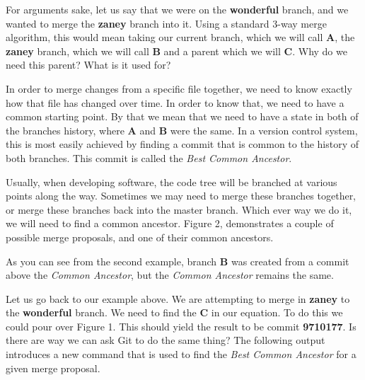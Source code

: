 
For arguments sake, let us say that we were on the \textbf{wonderful} branch, and we wanted to merge the \textbf{zaney} branch into it.
Using a standard 3-way merge algorithm, this would mean taking our current branch, which we will call \textbf{A}, the \textbf{zaney} branch, which we will call \textbf{B} and a parent which we will \textbf{C}.
Why do we need this parent? What is it used for?

In order to merge changes from a specific file together, we need to know exactly how that file has changed over time.
In order to know that, we need to have a common starting point.
By that we mean that we need to have a state in both of the branches history, where \textbf{A} and \textbf{B} were the same.
In a version control system, this is most easily achieved by finding a commit that is common to the history of both branches.
This commit is called the \emph{Best Common Ancestor}.

Usually, when developing software, the code tree will be branched at various points along the way.
Sometimes we may need to merge these branches together, or merge these branches back into the master branch.
Which ever way we do it, we will need to find a common ancestor.
Figure 2, demonstrates a couple of possible merge proposals, and one of their common ancestors.


As you can see from the second example, branch \textbf{B} was created from a commit above the \emph{Common Ancestor}, but the \emph{Common Ancestor} remains the same.

Let us go back to our example above.
We are attempting to merge in \textbf{zaney} to the \textbf{wonderful} branch.
We need to find the \textbf{C} in our equation.
To do this we could pour over Figure 1.
This should yield the result to be commit \textbf{9710177}.
Is there are way we can ask Git to do the same thing? The following output introduces a new command that is used to find the \emph{Best Common Ancestor} for a given merge proposal.


